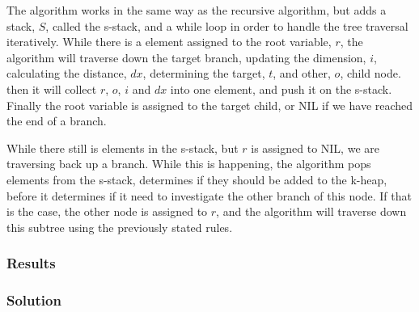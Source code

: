 The algorithm works in the same way as the recursive algorithm, but adds a stack, $S$, called the s-stack, and a while loop in order to handle the tree traversal iteratively. While there is a element assigned to the root variable, $r$, the algorithm will traverse down the target branch, updating the dimension, $i$, calculating the distance, $dx$, determining the target, $t$, and other, $o$, child node. then it will collect $r$, $o$, $i$ and $dx$ into one element, and push it on the s-stack. Finally the root variable is assigned to the target child, or NIL if we have reached the end of a branch.

While there still is elements in the s-stack, but $r$ is assigned to NIL, we are traversing back up a branch. While this is happening, the algorithm pops elements from the s-stack, determines if they should be added to the k-heap, before it determines if it need to investigate the other branch of this node. If that is the case, the other node is assigned to $r$, and the algorithm will traverse down this subtree using the previously stated rules.


\subsubsection{Results} %
\label{ssub:results}



\subsubsection{Solution} %
\label{ssub:solution}





